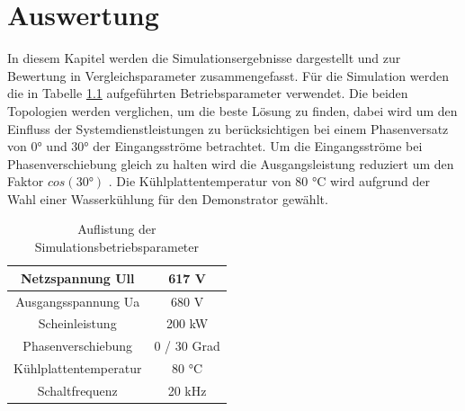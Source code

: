 \chapter{Auswertung}
In diesem Kapitel werden die Simulationsergebnisse dargestellt und zur Bewertung in Vergleichsparameter zusammengefasst. Für die Simulation werden die in Tabelle \ref{tab:Betriebspara} aufgeführten Betriebsparameter verwendet. Die beiden Topologien werden verglichen, um die beste Lösung zu finden, dabei wird um den Einfluss der Systemdienstleistungen zu berücksichtigen bei einem Phasenversatz von 0° und 30° der Eingangsströme betrachtet. Um die Eingangsströme bei Phasenverschiebung gleich zu halten wird die Ausgangsleistung reduziert um den Faktor $cos(30°)$ . Die Kühlplattentemperatur von 80 °C wird aufgrund der Wahl einer Wasserkühlung für den Demonstrator gewählt.

\begin{table}
	\centering
\begin{tabular}{|c|c|}
	\hline
	Netzspannung \gls{Ull} & 617 \si{\volt} \\
	\hline
	Ausgangsspannung \gls{Ua} & 680 V \\
	\hline
	Scheinleistung & 200 kW \\
	\hline
	Phasenverschiebung & 0 / 30 Grad \\
	\hline
	Kühlplattentemperatur & 80 °C \\
	\hline
	Schaltfrequenz & 20 kHz \\
	\hline
\end{tabular}
\caption{Auflistung der Simulationsbetriebsparameter}
\label{tab:Betriebspara}
\end{table}







